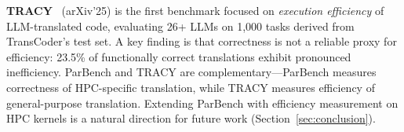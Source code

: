 \documentclass[conference]{IEEEtran}
\begin{document}
\textbf{TRACY}~\cite{TRACY2025} (arXiv'25) is the first benchmark focused on \emph{execution efficiency} of LLM-translated code, evaluating 26+ LLMs on 1,000 tasks derived from TransCoder's test set. A key finding is that correctness is not a reliable proxy for efficiency: 23.5\% of functionally correct translations exhibit pronounced inefficiency. ParBench and TRACY are complementary---ParBench measures correctness of HPC-specific translation, while TRACY measures efficiency of general-purpose translation. Extending ParBench with efficiency measurement on HPC kernels is a natural direction for future work (Section~\ref{sec:conclusion}).




\end{document}
